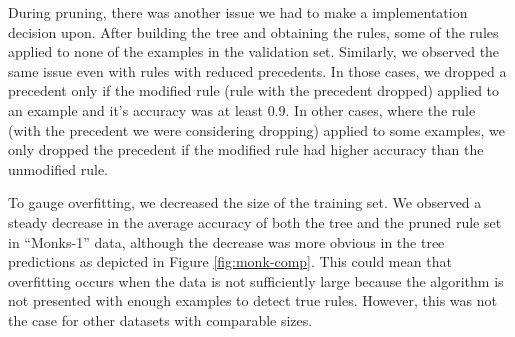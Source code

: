 \documentclass[12pt]{article}
\begin{document}
During pruning, there was another issue we had to make a
implementation decision upon. After building the tree and obtaining
the rules, some of the rules applied to none of the examples in the
validation set. Similarly, we observed the same issue even with rules
with reduced precedents. In those cases, we dropped a precedent only
if the modified rule (rule with the precedent dropped) applied to an
example and it's accuracy was at least $0.9$. In other cases, where the
rule (with the precedent we were considering dropping) applied to some
examples, we only dropped the precedent if the modified rule had
higher accuracy than the unmodified rule.

To gauge overfitting, we decreased the size of the training set. We
observed a steady decrease in the average accuracy of both the tree
and the pruned rule set in ``Monks-1'' data, although the decrease was
more obvious in the tree predictions as depicted in Figure
\ref{fig:monk-comp}. This could mean that overfitting occurs when the
data is not sufficiently large because the algorithm is not presented
with enough examples to detect true rules. However, this was not the
case for other datasets with comparable sizes.
\end{document}
